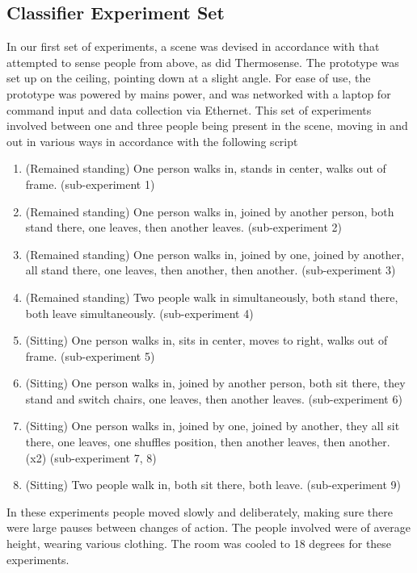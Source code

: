 \documentclass[../thesis/thesis.tex]{subfiles}
\begin{document}
\subsection{Classifier Experiment Set}
In our first set of experiments, a scene was devised in accordance with  that attempted to sense people from above, as did Thermosense. The prototype was set up on the ceiling, pointing down at a slight angle. For ease of use, the prototype was powered by mains power, and was networked with a laptop for command input and data collection via Ethernet. This set of experiments involved between one and three people being present in the scene, moving in and out in various ways in accordance with the following script

\begin{enumerate}
\item (Remained standing) One person walks in, stands in center, walks out of frame. (sub-experiment 1)
\item (Remained standing) One person walks in, joined by another person, both stand there, one leaves, then another leaves. (sub-experiment 2)
\item (Remained standing) One person walks in, joined by one, joined by another, all stand there, one leaves, then another, then another. (sub-experiment 3)
\item (Remained standing) Two people walk in simultaneously, both stand there, both leave simultaneously. (sub-experiment 4)
\item (Sitting) One person walks in, sits in center, moves to right, walks out of frame. (sub-experiment 5)
\item (Sitting) One person walks in, joined by another person, both sit there, they stand and switch chairs, one leaves, then another leaves. (sub-experiment 6)
\item (Sitting) One person walks in, joined by one, joined by another, they all sit there, one leaves, one shuffles position, then another leaves, then another. (x2) (sub-experiment 7, 8)
\item (Sitting) Two people walk in, both sit there, both leave. (sub-experiment 9)
\end{enumerate}

In these experiments people moved slowly and deliberately, making sure there were large pauses between changes of action. The people involved were of average height, wearing various clothing. The room was cooled to 18 degrees for these experiments.
\end{document}
